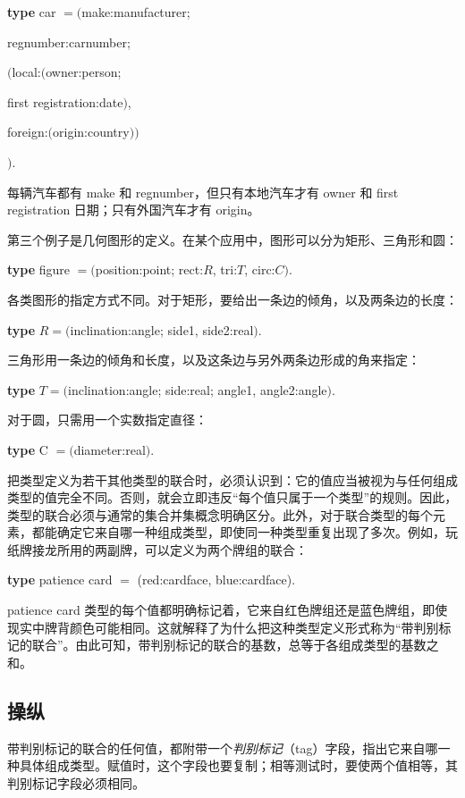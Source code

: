\documentclass[twoside,11pt,fontset=none]{ctexbook}
\begin{document}
\quad \textbf{type} car $= ($make:manufacturer;

\tabto{7.5em}regnumber:carnumber;

\tabto{7.5em}$($local:$($owner:person;

\tabto{7.8em}first registration:date$)$,

\tabto{7.8em}foreign:$($origin:country$))$

\tabto{7.1em}$)$.

\noindent
每辆汽车都有 make 和 regnumber，但只有本地汽车才有 owner 和 first registration 日期；只有外国汽车才有 origin。

第三个例子是几何图形的定义。在某个应用中，图形可以分为矩形、三角形和圆：

\quad \textbf{type} figure $= ($position:point; rect:$R$, tri:$T$, circ:$C)$.

\noindent
各类图形的指定方式不同。对于矩形，要给出一条边的倾角，以及两条边的长度：

\quad \textbf{type} $R = ($inclination:angle; side1, side2:real$)$.

\noindent
三角形用一条边的倾角和长度，以及这条边与另外两条边形成的角来指定：

\quad \textbf{type} $T = ($inclination:angle; side:real; angle1, angle2:angle$)$.

\noindent
对于圆，只需用一个实数指定直径：

\quad \textbf{type} C $= ($diameter:real$)$.

把类型定义为若干其他类型的联合时，必须认识到：它的值应当被视为与任何组成类型的值完全不同。否则，就会立即违反“每个值只属于一个类型”的规则。因此，类型的联合必须与通常的集合并集概念明确区分。此外，对于联合类型的每个元素，都能确定它来自哪一种组成类型，即使同一种类型重复出现了多次。例如，玩纸牌接龙所用的两副牌，可以定义为两个牌组的联合：

\quad \textbf{type} patience card $=$ (red:cardface, blue:cardface).

\noindent
patience card 类型的每个值都明确标记着，它来自红色牌组还是蓝色牌组，即使现实中牌背颜色可能相同。这就解释了为什么把这种类型定义形式称为“带判别标记的联合”。由此可知，带判别标记的联合的基数，总等于各组成类型的基数之和。

\subsection{操纵}

带判别标记的联合的任何值，都附带一个\textit{判别标记}（tag）字段，指出它来自哪一种具体组成类型。赋值时，这个字段也要复制；相等测试时，要使两个值相等，其判别标记字段必须相同。
\end{document}
